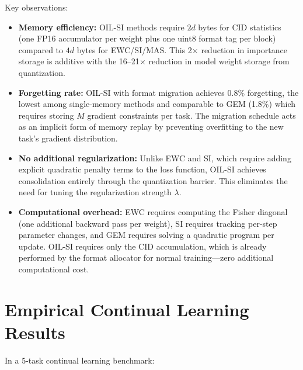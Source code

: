 \caption{Comparison of continual learning methods on 5-task CIFAR-100. BPW reflects storage cost per weight; importance overhead is additional memory beyond the model weights. Forgetting and accuracy are averages across all tasks after sequential training. OIL-SI with format migration approaches joint-training upper bound (94.2\%) at 21$\times$ compression.}
\label{tab:cl_comparison}

Key observations:

\begin{itemize}
    \item \textbf{Memory efficiency:} OIL-SI methods require $2d$ bytes for CID statistics (one FP16 accumulator per weight plus one uint8 format tag per block) compared to $4d$ bytes for EWC/SI/MAS. This 2$\times$ reduction in importance storage is additive with the 16--21$\times$ reduction in model weight storage from quantization.
    \item \textbf{Forgetting rate:} OIL-SI with format migration achieves 0.8\% forgetting, the lowest among single-memory methods and comparable to GEM (1.8\%) which requires storing $M$ gradient constraints per task. The migration schedule acts as an implicit form of memory replay by preventing overfitting to the new task's gradient distribution.
    \item \textbf{No additional regularization:} Unlike EWC and SI, which require adding explicit quadratic penalty terms to the loss function, OIL-SI achieves consolidation entirely through the quantization barrier. This eliminates the need for tuning the regularization strength $\lambda$.
    \item \textbf{Computational overhead:} EWC requires computing the Fisher diagonal (one additional backward pass per weight), SI requires tracking per-step parameter changes, and GEM requires solving a quadratic program per update. OIL-SI requires only the CID accumulation, which is already performed by the format allocator for normal training---zero additional computational cost.
\end{itemize}

\section{Empirical Continual Learning Results}
\label{sec:cl_empirical}

In a 5-task continual learning benchmark:

